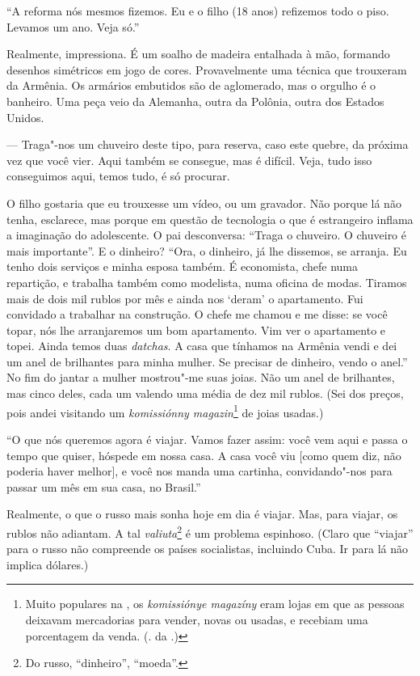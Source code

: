 {``A reforma nós mesmos fizemos. Eu e o filho (18 anos) refizemos todo o piso. Levamos um ano. Veja só.''

Realmente, impressiona. É um soalho de madeira entalhada à mão, formando desenhos simétricos em jogo de cores. Provavelmente uma
técnica que trouxeram da Armênia. Os armários embutidos são de aglomerado, mas o orgulho é o banheiro. Uma peça veio da Alemanha, outra da Polônia, outra dos Estados Unidos.

--- Traga"-nos um chuveiro deste tipo, para reserva, caso este quebre, da próxima vez que você vier. Aqui também se consegue, mas é difícil. Veja, tudo isso conseguimos aqui, temos tudo, é só procurar.

O filho gostaria que eu trouxesse um vídeo, ou um gravador. Não porque lá não tenha, esclarece, mas porque em questão de tecnologia o que é estrangeiro inflama a imaginação do adolescente. O pai desconversa: ``Traga o chuveiro. O chuveiro é mais importante''. E o dinheiro? ``Ora, o dinheiro, já lhe dissemos, se arranja. Eu tenho dois serviços e minha esposa também. É economista, chefe numa repartição, e trabalha também como modelista, numa oficina de modas. Tiramos mais de dois mil rublos por mês e ainda nos `deram' o apartamento. Fui convidado a trabalhar na construção. O chefe me chamou e me disse: se você topar, nós lhe arranjaremos um bom apartamento. Vim ver o apartamento e topei. Ainda temos duas \emph{datchas}. A casa que tínhamos na Armênia vendi e dei um anel de brilhantes para minha mulher. Se precisar de dinheiro, vendo o anel.'' No fim do jantar a mulher mostrou"-me suas joias. Não um anel de brilhantes, mas cinco deles, cada um valendo uma média de dez mil rublos. (Sei dos preços, pois andei visitando um \emph{komissiónny magazin}\footnote{Muito populares na , os \emph{komissiónye magazíny} eram lojas em que as pessoas deixavam mercadorias para vender, novas ou usadas, e recebiam uma porcentagem da venda. (. da .)} de joias usadas.)

``O que nós queremos agora é viajar. Vamos fazer assim: você vem aqui e passa o tempo que quiser, hóspede em nossa casa. A casa você viu [como quem diz, não poderia haver melhor], e você nos manda uma cartinha, convidando"-nos para passar um mês em sua casa, no Brasil.''

Realmente, o que o russo mais sonha hoje em dia é viajar. Mas, para viajar, os rublos não adiantam. A tal \emph{valiuta}\footnote{Do russo, ``dinheiro'', ``moeda''.} é um problema espinhoso. (Claro que ``viajar'' para o russo não compreende os países socialistas, incluindo Cuba. Ir para lá não implica dólares.)

}

